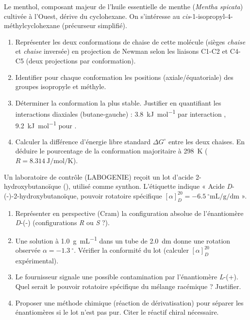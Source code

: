 \documentclass[11pt]{article}
\providecommand{\degree}{^{\circ}}
\begin{document}
\begin{exercice}
Le menthol, composant majeur de l'huile essentielle de menthe (\textit{Mentha spicata}) cultivée à l'Ouest, dérive du cyclohexane. On s'intéresse au \textit{cis}-1-isopropyl-4-méthylcyclohexane (précurseur simplifié).
\begin{enumerate}
    \item Représenter les deux conformations de chaise de cette molécule (sièges \textit{chaise} et \textit{chaise} inversée) en projection de Newman selon les liaisons C1-C2 et C4-C5 (deux projections par conformation).
    \item Identifier pour chaque conformation les positions (axiale/équatoriale) des groupes isopropyle et méthyle.
    \item Déterminer la conformation la plus stable. Justifier en quantifiant les interactions diaxiales (butane-gauche) : \SI{3.8}{\kilo\joule\per\mole} par interaction , \SI{9.2}{\kilo\joule\per\mole} pour .
    \item Calculer la différence d'énergie libre standard $\Delta G^\circ$ entre les deux chaises. En déduire le pourcentage de la conformation majoritaire à \SI{298}{\kelvin} ($R = \SI{8.314}{\joule\per\mole\per\kelvin}$).
\end{enumerate}
\end{exercice}

\begin{exercice}
Un laboratoire de contrôle (LABOGENIE) reçoit un lot d'acide 2-hydroxybutanoïque (), utilisé comme synthon. L'étiquette indique « Acide \textit{D}-(-)-2-hydroxybutanoïque, pouvoir rotatoire spécifique $[\alpha]_D^{20} = -\SI{6.5}{\degree\milli\liter\per\gram\per\deci\meter}$ ».
\begin{enumerate}
    \item Représenter en perspective (Cram) la configuration absolue de l'énantiomère \textit{D}-(-) (configurations \textit{R} ou \textit{S} ?).
    \item Une solution à \SI{1.0}{\gram\per\milli\liter} dans un tube de \SI{2.0}{\deci\meter} donne une rotation observée $\alpha = -\SI{1.3}{\degree}$. Vérifier la conformité du lot (calculer $[\alpha]_D^{20}$ expérimental).
    \item Le fournisseur signale une possible contamination par l'énantiomère \textit{L}-(+). Quel serait le pouvoir rotatoire spécifique du mélange racémique ? Justifier.
    \item Proposer une méthode chimique (réaction de dérivatisation) pour séparer les énantiomères si le lot n'est pas pur. Citer le réactif chiral nécessaire.
\end{enumerate}
\end{exercice}
\end{document}
